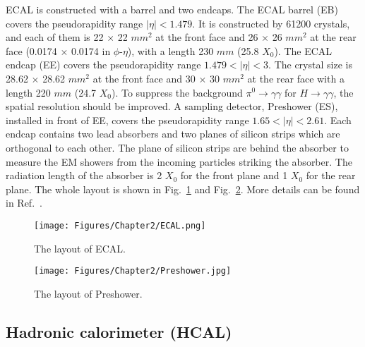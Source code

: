 ECAL is constructed with a barrel and two endcaps.
The ECAL barrel (EB) covers the pseudorapidity range $\vert\eta\vert < 1.479$.
It is constructed by 61200 crystals, and each of them is 22 $\times$ 22 $mm^{2}$ at the front face and 26 $\times$ 26 $mm^{2}$ at the rear face (0.0174 $\times$ 0.0174 in $\phi$-$\eta$), with a length 230 $mm$ (25.8 $X_{0}$). 
The ECAL endcap (EE) covers the pseudorapidity range $1.479 < \vert\eta\vert < 3$.
The crystal size is 28.62 $\times$ 28.62 $mm^{2}$ at the front face and 30 $\times$ 30 $mm^{2}$ at the rear face with a length 220 $mm$ (24.7 $X_{0}$).
To suppress the background $\pi^{0}\rightarrow\gamma\gamma$ for $H\rightarrow\gamma\gamma$, the spatial resolution should be improved. 
A sampling detector, Preshower (ES), installed in front of EE, covers the pseudorapidity range $1.65 < \vert\eta\vert < 2.61$.
Each endcap contains two lead absorbers and two planes of silicon strips which are orthogonal to each other.
The plane of silicon strips are behind the absorber to measure the EM showers from the incoming particles striking the absorber. The radiation length of the absorber is 2 $X_{0}$ for the front plane and 1 $X_{0}$ for the rear plane.
The whole layout is shown in Fig.~\ref{fig:CMSECAL} and Fig.~\ref{fig:CMSPreshower}.
More details can be found in Ref.~\cite{CMS:ECALprjt}.

\begin{figure}[t]
  \centering
  \texttt{[image: Figures/Chapter2/ECAL.png]}
  \caption{The layout of ECAL.}
  \label{fig:CMSECAL}
\end{figure}

\begin{figure}[t]
  \centering
  \texttt{[image: Figures/Chapter2/Preshower.jpg]}
  \caption{The layout of Preshower.}
  \label{fig:CMSPreshower}
\end{figure}

\clearpage

\subsection{Hadronic calorimeter (HCAL)}

